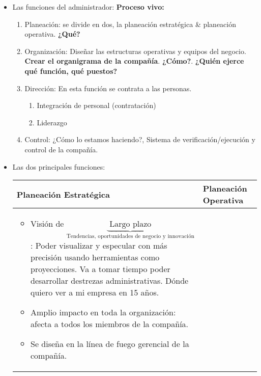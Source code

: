 \begin{itemize}
    \item Las funciones del administrador: \textbf{Proceso vivo:}
        \begin{center}
        \end{center}
        \begin{enumerate}
            \item Planeación: se divide en dos, la planeación estratégica \& planeación operativa. \textbf{¿Qué?}
            \item Organización: Diseñar las estructuras operativas y equipos del negocio. \textbf{Crear el organigrama de la compañía}. \textbf{¿Cómo?}. \textbf{¿Quién ejerce qué función, qué puestos?}
            \item Dirección: En esta función se contrata a las personas.
                \begin{enumerate}
                    \item Integración de personal (contratación)
                    \item Liderazgo
                \end{enumerate}
            \item Control: ¿Cómo lo estamos haciendo?, Sistema de verificación/ejecución y control de la compañía.
        \end{enumerate}
    
    \item Las dos principales funciones:
        \begin{center}
           \begin{tabular}{| p{5cm} | p{5cm} | }
               \hline
                    Planeación Estratégica & Planeación Operativa    \\
               \hline
                    \begin{itemize}
                        \item Visión de $\underbrace{\text{  Largo plazo  }}_{\text{Tendencias, oportunidades de negocio y innovación}}$: Poder visualizar y especular con más precisión usando herramientas como proyecciones. Va a tomar tiempo poder desarrollar destrezas administrativas. Dónde quiero ver a mi empresa en 15 años.
                        \item Amplio impacto en toda la organización: afecta a todos los miembros de la compañía.
                        \item Se diseña en la línea de fuego gerencial de la compañía.
                    \end{itemize} & 


\end{tabular}
\end{center}
\end{itemize}
